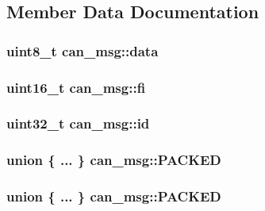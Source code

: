 \subsection{Member Data Documentation}
\subsubsection[{\texorpdfstring{data}{data}}]{\setlength{\rightskip}{0pt plus 5cm}uint8\+\_\+t can\+\_\+msg\+::data}\hypertarget{structcan__msg_ac0dab268ebadaa9521b4d535c03f13d8}{}\label{structcan__msg_ac0dab268ebadaa9521b4d535c03f13d8}
\subsubsection[{\texorpdfstring{fi}{fi}}]{\setlength{\rightskip}{0pt plus 5cm}uint16\+\_\+t can\+\_\+msg\+::fi}\hypertarget{structcan__msg_ad1e9cccb168fbc295bb79ef7d9c5c915}{}\label{structcan__msg_ad1e9cccb168fbc295bb79ef7d9c5c915}
\subsubsection[{\texorpdfstring{id}{id}}]{\setlength{\rightskip}{0pt plus 5cm}uint32\+\_\+t can\+\_\+msg\+::id}\hypertarget{structcan__msg_a9a5f820883d3dfe1f0c6bc33c3f95989}{}\label{structcan__msg_a9a5f820883d3dfe1f0c6bc33c3f95989}
\subsubsection[{\texorpdfstring{P\+A\+C\+K\+ED}{PACKED}}]{\setlength{\rightskip}{0pt plus 5cm}union \{ ... \}  can\+\_\+msg\+::\+P\+A\+C\+K\+ED}\hypertarget{structcan__msg_a233f7f010cc90ec3d453bcb75d66c14e}{}\label{structcan__msg_a233f7f010cc90ec3d453bcb75d66c14e}
\subsubsection[{\texorpdfstring{P\+A\+C\+K\+ED}{PACKED}}]{\setlength{\rightskip}{0pt plus 5cm}union \{ ... \}  can\+\_\+msg\+::\+P\+A\+C\+K\+ED}\hypertarget{structcan__msg_a11a48cac095afd9250fe22fa37929aec}{}\label{structcan__msg_a11a48cac095afd9250fe22fa37929aec}
